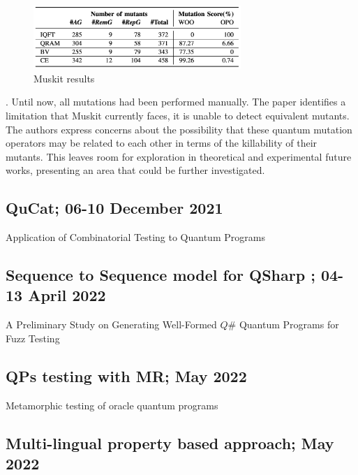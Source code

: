 \begin{itemize}
\begin{figure}[H]
        \centering
        \includegraphics[width=0.7\textwidth]{TFM/photos/MuskitResults.png}
        \caption{Muskit results \cite{mendiluze2021muskit}} 
        \label{Fig:MuskitRes}
\end{figure}

. Until now, all mutations had been performed manually. The paper identifies a limitation that Muskit currently faces, it is unable to detect equivalent mutants. The authors express concerns about the possibility that these quantum mutation operators may be related to each other in terms of the killability of their mutants. This leaves room for exploration in theoretical and experimental future works, presenting an area that could be further investigated.

\vspace{15pt}
\subsection{QuCat; 06-10 December 2021}

Application of Combinatorial Testing to Quantum Programs \cite{wang2021application}

\vspace{15pt}
\subsection{Sequence to Sequence model for QSharp ; 04-13 April 2022}

A Preliminary Study on Generating Well-Formed
$Q\#$ Quantum Programs for Fuzz Testing 

\vspace{15pt}
\subsection{QPs testing with MR; May 2022}

Metamorphic testing of oracle quantum programs \cite{abreu2022metamorphic}

\vspace{15pt}
\subsection{Multi-lingual property based approach; May 2022}


\end{itemize}
